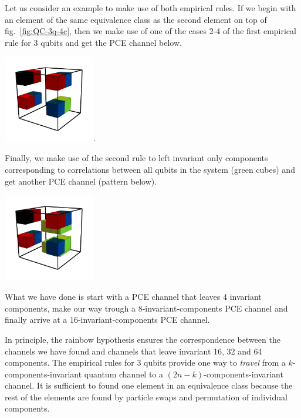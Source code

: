 \documentclass[11pt,dvipsnames]{article} %
\newcommand{\fref}[1]{fig.~\ref{#1}}  \newcommand{\tref}[1]{table~\ref{#1}}
\newcommand{\1}{\mathds{1}}
\begin{document}
Let us consider an example to make use of both empirical rules. If we 
begin with an element of the same equivalence class as the second
element on top of \fref{fig:QC-3q-4c}, then we make use of one of 
the cases 2-4 of the first empirical rule for 3 qubits and get the PCE channel below.
\begin{center}
	\includegraphics[width=4cm]{img/3q-8c-je}.
\end{center}
Finally, we make use of the second rule to left invariant only components
corresponding to correlations between all qubits in the system (green cubes)
and get another PCE channel (pattern below).
\begin{center}
	\includegraphics[width=4cm]{img/3q-8c}
\end{center}
What we have done is start with a PCE channel that leaves 4 invariant
components, make our way trough a 8-invariant-components PCE channel and 
finally arrive at a 16-invariant-components PCE channel.

In principle, the rainbow hypothesis ensures the correspondence between  
the channels we have found and channels that leave invariant 16, 32 and 64
components. The empirical rules for 3 qubits provide one way to \textit{travel}
from a $k$-components-invariant quantum channel to a
$(2n-k)$-components-invariant channel.
It is sufficient to found one element in an 
equivalence class because the rest of the elements are found 
by particle swaps and permutation of individual components.
\end{document}
